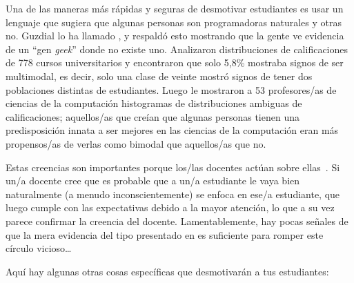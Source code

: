 Una de las maneras más rápidas y seguras de desmotivar estudiantes es
usar un lenguaje que sugiera que algunas personas son programadoras naturales y otras no.
Guzdial lo ha llamado
,
y \cite{Pati2016} respaldó esto mostrando que
la gente ve evidencia de un ``gen \emph{geek}'' donde no existe uno.
Analizaron distribuciones de calificaciones de 778 cursos universitarios y encontraron que solo 5,8\% mostraba signos
de ser multimodal,
es decir, solo una clase de veinte mostró signos de tener dos poblaciones distintas de estudiantes.
Luego le mostraron a 53 profesores/as de ciencias de la computación histogramas de distribuciones ambiguas de calificaciones;
aquellos/as que creían que algunas personas tienen una predisposición innata a ser mejores en las ciencias de la computación
eran más propensos/as de verlas como bimodal que aquellos/as que no.

Estas creencias son importantes porque los/las docentes actúan sobre ellas~\cite{Brop1983}.
Si un/a docente cree que es probable que a un/a estudiante le vaya bien
naturalmente (a menudo inconscientemente) se enfoca en ese/a estudiante,
que luego cumple con las expectativas debido a la mayor atención,
lo que a su vez parece confirmar la creencia del docente.
Lamentablemente,
hay pocas señales de que la mera evidencia del tipo presentado en \cite{Pati2016}
es suficiente para romper este círculo vicioso{\ldots}

Aquí hay algunas otras cosas específicas que desmotivarán a tus estudiantes:

